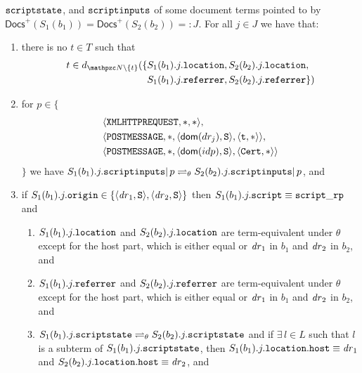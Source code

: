 \begin{definition}
\begin{enumerate}
\begin{enumerate}
        $\mathtt{scriptstate}$, and $\mathtt{scriptinputs}$ of some document terms
        pointed to by $\mathsf{Docs}^+(S_1(b_1)) = \mathsf{Docs}^+(S_2(b_2)) =: J$. 
        For all $j \in J$ we have that: \label{eqs:b:w}
        \begin{enumerate}
        \item there is no $t \in T$ such that
          \begin{align*}
            t \in d_{\nonces \setminus \{t\}}(\{&S_1(b_1).j.\str{location}
            ,  S_2(b_2).j.\str{location},\\ & S_1(b_1).j.\str{referrer} , 
            S_2(b_2).j.\str{referrer}\})
          \end{align*}
        \item for $p \in \{$
          \begin{align*}
            & \langle\mathtt{XMLHTTPREQUEST},*,*\rangle,\\
            & \langle\mathtt{POSTMESSAGE},*,\langle\mathsf{dom}(dr_j), \mathtt{S}\rangle,\langle\mathtt{t}, *\rangle\rangle,\\
            & \langle\mathtt{POSTMESSAGE},*,\langle\mathsf{dom}(idp), \mathtt{S}\rangle,\langle\mathtt{Cert}, *\rangle\rangle
          \end{align*}
          $\}$ we have
          $S_1(b_1).j.\mathtt{scriptinputs} |\, p \rightleftharpoons_{\theta}
          S_2(b_2).j.\mathtt{scriptinputs} |\, p$, and
        \item\label{eqs:b:w:script_rp} if
          $S_1(b_1).j.\mathtt{origin} \in \{\langle\mathit{dr}_1, \mathtt{S}\rangle,\langle\mathit{dr}_2, \mathtt{S}\rangle\}$
          then $S_1(b_1).j.\mathtt{script} \equiv \mathtt{script\_rp}$ and \
          \begin{enumerate}
          \item $S_1(b_1).j.\mathtt{location}$ and $S_2(b_2).j.\mathtt{location}$
            are term-equivalent under $\theta$ except for the host part,
            which is either equal or $\mathit{dr}_1$ in $b_1$ and $\mathit{dr}_2$ in
            $b_2$, and
          \item $S_1(b_1).j.\mathtt{referrer}$ and $S_2(b_2).j.\mathtt{referrer}$
            are term-equivalent under $\theta$ except for the host part,
            which is either equal or $\mathit{dr}_1$ in $b_1$ and $\mathit{dr}_2$ in
            $b_2$, and
          \item
            $S_1(b_1).j.\mathtt{scriptstate} \rightleftharpoons_{\theta}
            S_2(b_2).j.\mathtt{scriptstate}$ and if $\exists\, l \in L$ such that $l$ is a subterm of $S_1(b_1).j.\mathtt{scriptstate}$, then $S_1(b_1).j.\mathtt{location}.\mathtt{host} \equiv \mathit{dr}_1$ and $S_2(b_2).j.\mathtt{location}.\mathtt{host} \equiv \mathit{dr}_2$, and

\end{enumerate}
\end{enumerate}
\end{enumerate}
\end{enumerate}
\end{definition}

